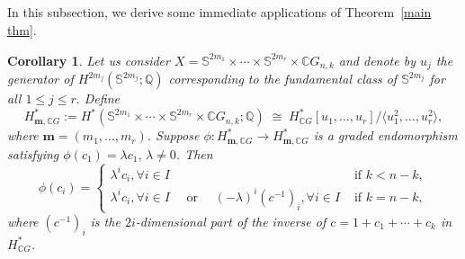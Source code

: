 \documentclass{amsart}
\newtheorem{corollary}[theorem]{Corollary}
\newcommand{\thmref}[1]{Theorem~\ref{#1}}
\begin{document}
	\subsection{} In this subsection, we derive some immediate applications of \thmref{main thm}.
	\begin{corollary}
		Let us consider $X = \mathbb{S}^{2m_1} \times \cdots \times \mathbb{S}^{2m_r} \times \mathbb{C}G_{n,k}$ and denote by $u_j$ the generator of $H^{2m_j}(\mathbb{S}^{2m_j}; \mathbb{Q})$ corresponding to the fundamental class of $\mathbb S^{2m_j}$ for all $1\leq j \leq r.$ Define  
		\[
		H^*_{\mathbf{m}, \mathbb{C}G} := H^*(\mathbb{S}^{2m_1} \times \cdots \times \mathbb{S}^{2m_r} \times \mathbb{C}G_{n,k}; \mathbb{Q})
		\;\cong\; H^*_{\mathbb{C}G}[u_1,\ldots,u_r] \big/ \langle u_1^2,\ldots,u_r^2 \rangle,
		\] where $\mathbf{m} = (m_1, \ldots, m_r)$.
		Suppose $\phi: H^*_{\mathbf{m}, \mathbb{C}G} \to H^*_{\mathbf{m}, \mathbb{C}G}$ is a graded endomorphism satisfying $\phi(c_1)=\lambda c_1,\, \lambda \neq 0$. Then $$\phi(c_i) = \begin{cases}
			\lambda^i c_i,   \forall i \in I& \text{ if } k<n-k,\\
			\lambda^i c_i,  \forall i \in I \quad \text{ or } \quad(-\lambda)^i (c^{-1})_i,    \forall i \in I & \text{ if } k= n-k,
		\end{cases}$$
		where $ (c^{-1})_i $ is the $ 2i $-dimensional part of the inverse of $ c = 1 + c_1 + \cdots + c_k $ in $ H^*_{ \mathbb CG} $. 
	\end{corollary}
\end{document}
